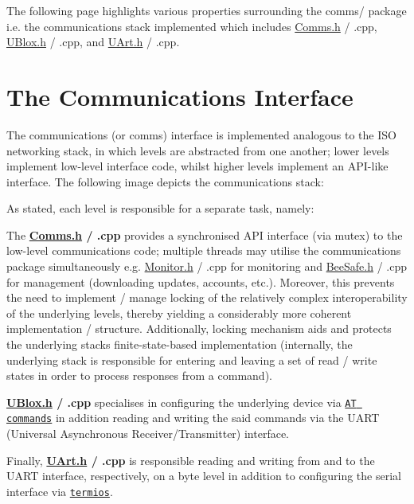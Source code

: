 The following page highlights various properties surrounding the comms/ package i.\+e. the communications stack implemented which includes \hyperlink{_comms_8h}{Comms.\+h} / .cpp, \hyperlink{_u_blox_8h}{U\+Blox.\+h} / .cpp, and \hyperlink{_u_art_8h}{U\+Art.\+h} / .cpp.

\section*{The Communications Interface}

The communications (or comms) interface is implemented analogous to the I\+SO networking stack, in which levels are abstracted from one another; lower levels implement low-\/level interface code, whilst higher levels implement an A\+P\+I-\/like interface. The following image depicts the communications stack\+:



As stated, each level is responsible for a separate task, namely\+:
\begin{DoxyItemize}
\item The {\bfseries \hyperlink{_comms_8h}{Comms.\+h} / .cpp} provides a synchronised A\+PI interface (via mutex) to the low-\/level communications code; multiple threads may utilise the communications package simultaneously e.\+g. \hyperlink{_monitor_8h}{Monitor.\+h} / .cpp for monitoring and \hyperlink{_bee_safe_8h}{Bee\+Safe.\+h} / .cpp for management (downloading updates, accounts, etc.). Moreover, this prevents the need to implement / manage locking of the relatively complex interoperability of the underlying levels, thereby yielding a considerably more coherent implementation / structure. Additionally, locking mechanism aids and protects the underlying stacks finite-\/state-\/based implementation (internally, the underlying stack is responsible for entering and leaving a set of read / write states in order to process responses from a command).
\item {\bfseries \hyperlink{_u_blox_8h}{U\+Blox.\+h} / .cpp} specialises in configuring the underlying device via \href{https://github.com/itsBelinda/ENG5220-2020-Team13/wiki/uBlox-and-CellLocate}{\tt AT commands} in addition reading and writing the said commands via the U\+A\+RT (Universal Asynchronous Receiver/\+Transmitter) interface.
\item Finally, {\bfseries \hyperlink{_u_art_8h}{U\+Art.\+h} / .cpp} is responsible reading and writing from and to the U\+A\+RT interface, respectively, on a byte level in addition to configuring the serial interface via \href{http://man7.org/linux/man-pages/man3/termios.3.html}{\tt termios}.
\end{DoxyItemize}


